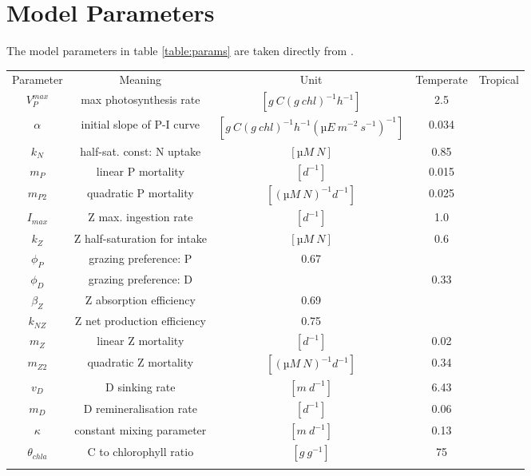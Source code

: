 \documentclass[journal abbreviation, manuscript]{copernicus}
\begin{document}
\section{Model Parameters}
The model parameters in table \ref{table:params} are taken directly from \citet{Anderson2015c}.
%
\begin{table*}[t]
\caption{Model Parameters}
\begin{tabular}{c c c c c}
Parameter & Meaning & Unit & Temperate & Tropical \\
\tophline
$V^{max}_P$ & max photosynthesis rate & $[g \ C (g \ chl)^{−1} h^{−1}]$ & 2.5  &  \\
$\alpha$ & initial slope of P-I curve & $[g \ C (g \ chl)^{−1} h^{−1} (µE \ m^{-2} \ s^{-1})^{-1}]$ & 0.034 & \\
$k_N$ & half-sat. const: N uptake & $[µM \ N]$ & 0.85 & \\
$m_P$ & linear P mortality & $[d^{−1}]$ & 0.015 & \\
$m_{P2}$ & quadratic P mortality & $[(µM \ N)^{-1} d^{−1}]$ & 0.025 & \\
$I_{max}$ & Z max. ingestion rate & $[d^{−1}]$ & 1.0 & \\
$k_Z$ & Z half-saturation for intake & $[µM \ N]$ & 0.6 & \\
$\phi_P$ & grazing preference: P & 0.67 & & \\
$\phi_D$ & grazing preference: D & & 0.33 & \\
$\beta_Z$ & Z absorption efficiency & 0.69 & & \\
$k_{NZ}$ & Z net production efficiency & 0.75 & & \\
$m_Z$ & linear Z mortality  & $[d^{−1}]$ & 0.02 & \\
$m_{Z2}$ & quadratic Z mortality & $[(µM \ N)^{-1} d^{−1}]$ & 0.34 & \\
$v_D$ & D sinking rate & $[m \ d^{−1}]$ & 6.43 & \\
$m_D$ & D remineralisation rate & $[d^{−1}]$ & 0.06 & \\
$\kappa$ & constant mixing parameter & $[m \ d^{−1}]$ & 0.13 & \\
$\theta_{chla}$ & C to chlorophyll ratio & $[g \ g^{-1}]$ & 75 & \\
\middlehline

\bottomhline
\end{tabular}
\label{table:params}
\end{table*}
%
\end{document}
